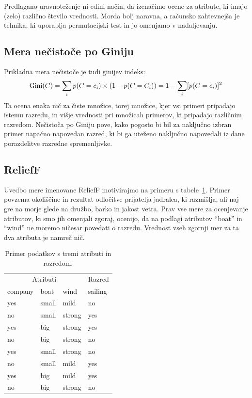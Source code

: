 Predlagano uravnoteženje ni edini način, da izenačimo ocene za atribute, ki imajo (zelo) različno število vrednosti. Morda bolj naravna, a računsko zahtevnejša je tehnika, ki uporablja permutacijski test in jo omenjamo v nadaljevanju.

\subsection{Mera nečistoče po Giniju}

Prikladna mera nečistoče je tudi ginijev indeks:
$$ {\rm Gini}(C)=\sum_{i}p(C=c_i)\times (1-p(C=C_i)) = 1 - \sum_i [p(C=c_i)]^2 $$
Ta ocena enaka nič za čiste množice, torej množice, kjer vsi primeri pripadajo istemu razredu, in višje vrednosti pri množicah primerov, ki pripadajo različnim razredom. Nečistoča po Giniju pove, kako pogosto bi bil za naključno izbran primer napačno napovedan razred, ki bi ga uteženo naključno napovedali iz dane porazdelitve razredne spremenljivke.

\subsection{ReliefF}

Uvedbo mere imenovane ReliefF motivirajmo na primeru s tabele~\ref{t-xor-boat}. Primer povzema okoliščine in rezultat odločitve prijatelja jadralca, ki razmišlja, ali naj gre na morje glede na družbo, barko in jakost vetra. Prav vse mere za ocenjevanje atributov, ki smo jih omenjali zgoraj, ocenijo, da na podlagi atributov ``boat'' in ``wind'' ne moremo ničesar povedati o razredu. Vrednost vseh zgornji mer za ta dva atributa je namreč nič.

\begin{table}[htbp]
\caption{Primer podatkov s tremi atributi in razredom.}
\label{t-xor-boat}
\begin{center}
\begin{tabular}{llll}
\toprule
\multicolumn{3}{c}{Atributi} & Razred \\ \cmidrule(r){1-3} \cmidrule(r){4-4}
company & boat & wind & sailing \\
\midrule
yes & small & mild & no \\
no & small & strong & yes \\
yes & big & strong & yes \\
no & big & strong & no \\
yes & small & strong & no \\
no & small & mild & yes \\
yes & big & mild & yes \\
no & big & strong & no \\
\bottomrule
\end{tabular}
\end{center}
\end{table}


